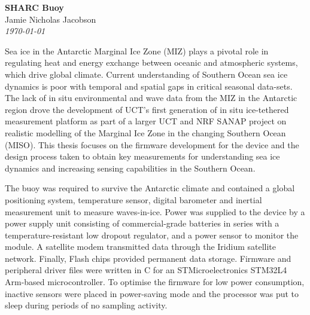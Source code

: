 \documentclass[a4paper, 12pt, oneside, openright, parskip=full]{book}
\newcommand{\auth}{Jamie Nicholas Jacobson}								%
\newcommand{\titl}{SHARC Buoy}						%
\begin{document}
%
\begin{center}
	\textbf{\Large \titl}\\
			\vskip 0.2cm
			\auth\\
			\vskip 0.2cm
	\textit{\footnotesize\today}
		
\end{center}
Sea ice in the Antarctic Marginal Ice Zone (MIZ) plays a pivotal role in regulating heat and energy exchange between oceanic and atmospheric systems, which drive global climate. Current understanding of Southern Ocean sea ice dynamics is poor with temporal and spatial gaps in critical seasonal data-sets. The lack of in situ environmental and wave data from the MIZ in the Antarctic region drove the development of UCT’s first generation of in situ ice-tethered measurement platform as part of a larger UCT and NRF SANAP project on realistic modelling of the Marginal Ice Zone in the changing Southern Ocean (MISO). This thesis focuses on the firmware development for the device and the design process taken to obtain key measurements for understanding sea ice dynamics and increasing sensing capabilities in the Southern Ocean.\par 

The buoy was required to survive the Antarctic climate and contained a global positioning system, temperature sensor, digital barometer and inertial measurement unit to measure waves-in-ice. Power was supplied to the device by a power supply unit consisting of commercial-grade batteries in series with a temperature-resistant low dropout regulator, and a power sensor to monitor the module. A satellite modem transmitted data through the Iridium satellite network. Finally, Flash chips provided permanent data storage. Firmware and peripheral driver files were written in C for an STMicroelectronics STM32L4 Arm-based microcontroller. To optimise the firmware for low power consumption, inactive sensors were placed in power-saving mode and the processor was put to sleep during periods of no sampling activity. \par 
\end{document}

